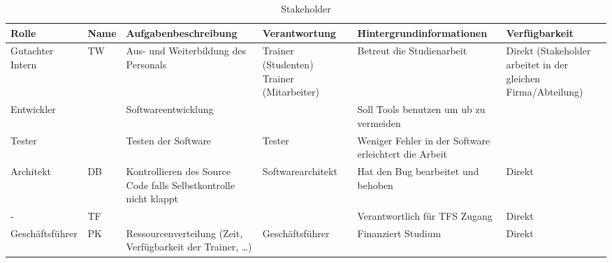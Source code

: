 \begin{table}[H]
    {
        \tiny
        \begin{tabularx}{\linewidth}{|X|X|X|X|X|X|}
            \hline
            Rolle
             & Name
             & Aufgabenbeschreibung
             & Verantwortung
             & Hintergrundinformationen
             & Verfügbarkeit
            \\
            \hline
            \cline{1-6}
            Gutachter Intern
             & TW
             & Aus- und Weiterbildung des Personals
             & Trainer (Studenten) \newline
            Trainer (Mitarbeiter)
             & Betreut die Studienarbeit
             & Direkt (Stakeholder arbeitet in der gleichen Firma/Abteilung)
            \\
            \cline{1-6}
            Entwickler
             &
             & Softwareentwicklung
             &
             & Soll Tools benutzen um \gls{ub} zu vermeiden
             &
            \\
            \cline{1-6}
            Tester
             &
             & Testen der Software
             & Tester
             & Weniger Fehler in der Software erleichtert die Arbeit
             &
            \\
            \cline{1-6}
            Architekt
             & DB
             & Kontrollieren des Source Code falls Selbstkontrolle nicht klappt
             & Softwarearchitekt
             & Hat den Bug bearbeitet und behoben
             & Direkt
            \\
            \cline{1-6}
            -
             & TF
             &
             &
             & Verantwortlich für TFS Zugang
             & Direkt
            \\
            \cline{1-6}
            Geschäftsführer
             & PK
             & Ressourcenverteilung (Zeit, Verfügbarkeit der Trainer, \dots)
             & Geschäftsführer
             & Finanziert Studium
             & Direkt
            \\
            \hline
        \end{tabularx}
    }
    \caption{Stakeholder}
    \label{tab:stakeholder}
\end{table}